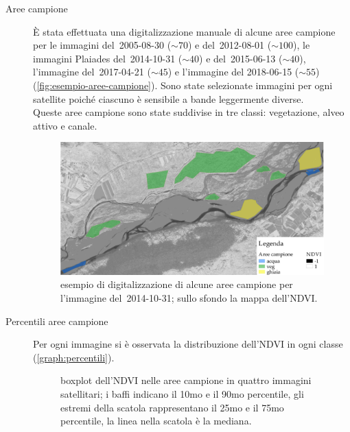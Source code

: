 \begin{description}
\begin{equation}
		\label{eq:ndvi}
	\end{equation}
	\item[Aree campione]
	\`{E} stata effettuata una digitalizzazione manuale di alcune aree campione per le immagini \AST{} del~2005-08-30 ($\sim 70$) e del~2012-08-01 ($\sim 100$), le immagini Plaiades del~2014-10-31 ($\sim 40$) e del~2015-06-13 ($\sim 40$), l'immagine \Se{} del~2017-04-21 ($\sim 45$) e l'immagine \WV{} del 2018-06-15 ($\sim 55$) (\vref{fig:esempio-aree-campione}).
	Sono state selezionate immagini per ogni satellite poiché ciascuno è sensibile a bande leggermente diverse. 
	\\
	Queste aree campione sono state suddivise in tre classi: vegetazione, alveo attivo e canale.
	\begin{figure}[ht]
		\centering
		\includegraphics[width=\textwidth]{files/esempio_aree_campione_2014_10_31.jpeg}
		\caption[esempio di aree campione per calcolare la distribuzione dell'NDVI]{esempio di digitalizzazione di alcune aree campione per l'immagine \Pl{} del~2014-10-31; sullo sfondo la mappa dell'NDVI.}
		\label{fig:esempio-aree-campione}
	\end{figure}
	\item[Percentili aree campione]
	Per ogni immagine si è osservata la distribuzione dell'NDVI in ogni classe (\vref{graph:percentili}).
	\begin{figure}[ht]
		\centering
		
		\caption[boxplot dell'NDVI nelle aree campione in quattro immagini satellitari]{boxplot dell'NDVI nelle aree campione in quattro immagini satellitari; i baffi indicano il 10mo e il 90mo percentile, gli estremi della scatola rappresentano il 25mo e il 75mo percentile, la linea nella scatola è la mediana.}

\end{figure}
\end{description}
